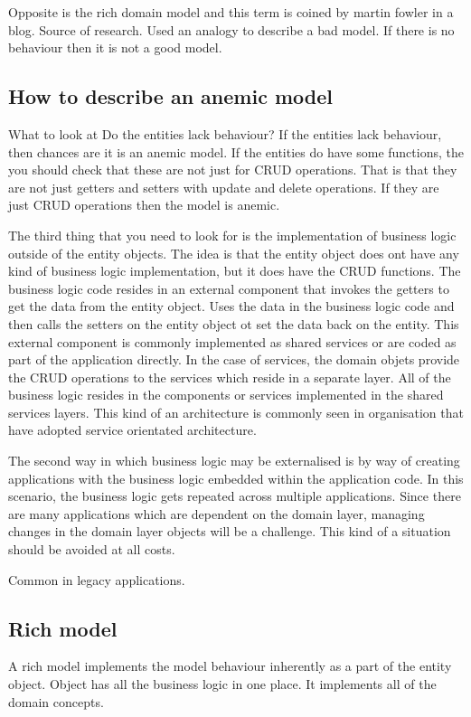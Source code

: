 Opposite is the rich domain model and this term is coined by martin fowler in a blog. Source of research.
Used an analogy to describe a bad model.
If there is no behaviour then it is not a good model.

\subsection{How to describe an anemic model}
What to look at
Do the entities lack behaviour?
If the entities lack behaviour, then chances are it is an anemic model.
If the entities do have some functions, the you should check that these are not just for CRUD operations.
That is that they are not just getters and setters with update and delete operations.
If they are just CRUD operations then the model is anemic.

The third thing that you need to look for is the implementation of business logic outside of the entity objects.
The idea is that the entity object does ont have any kind of business logic implementation, but it does have the CRUD functions.
The business logic code resides in an external component that invokes the getters to get the data from the entity object.
Uses the data in the business logic code and then calls the setters on the entity object ot set the data back on the entity.
This external component is commonly implemented as shared services or are coded as part of the application directly.
In the case of services, the domain objets provide the CRUD operations to the services which reside in a separate layer.
All of the business logic resides in the components or services implemented in the shared services layers.
This kind of an architecture is commonly seen in organisation that have adopted service orientated architecture.

The second way in which business logic may be externalised is by way of creating applications with the business logic embedded within the application code.
In this scenario, the business logic gets repeated across multiple applications.
Since there are many applications which are dependent on the domain layer, managing changes in the domain layer objects will be a challenge.
This kind of a situation should be avoided at all costs.

\begin{note}
    Common in legacy applications.
\end{note}

\subsection{Rich model}
A rich model implements the model behaviour inherently as a part of the entity object.
Object has all the business logic in one place.
It implements all of the domain concepts.


